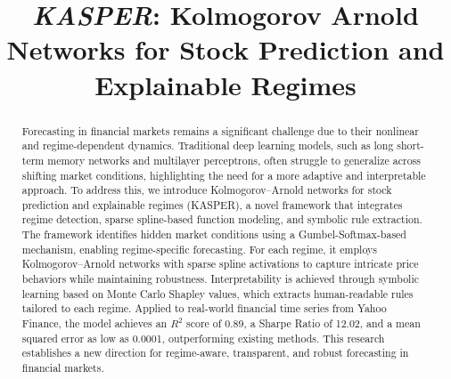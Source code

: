 \documentclass[conference,10pt]{IEEEtran}
\begin{document}
\title{\textit{KASPER}: Kolmogorov Arnold Networks for Stock Prediction and Explainable Regimes}

\author{
} 



\maketitle

\begin{abstract}
Forecasting in financial markets remains a significant challenge due to their nonlinear and regime-dependent dynamics. Traditional deep learning models, such as long short-term memory networks and multilayer perceptrons, often struggle to generalize across shifting market conditions, highlighting the need for a more adaptive and interpretable approach. To address this, we introduce Kolmogorov–Arnold networks for stock prediction and explainable regimes (KASPER), a novel framework that integrates regime detection, sparse spline-based function modeling, and symbolic rule extraction.
The framework identifies hidden market conditions using a Gumbel-Softmax-based mechanism, enabling regime-specific forecasting. For each regime, it employs Kolmogorov–Arnold networks with sparse spline activations to capture intricate price behaviors while maintaining robustness. Interpretability is achieved through symbolic learning based on Monte Carlo Shapley values, which extracts human-readable rules tailored to each regime.
Applied to real-world financial time series from Yahoo Finance, the model achieves an $R^2$ score of 0.89, a Sharpe Ratio of 12.02, and a mean squared error as low as 0.0001, outperforming existing methods. This research establishes a new direction for regime-aware, transparent, and robust forecasting in financial markets.
\end{abstract}
\end{document}
